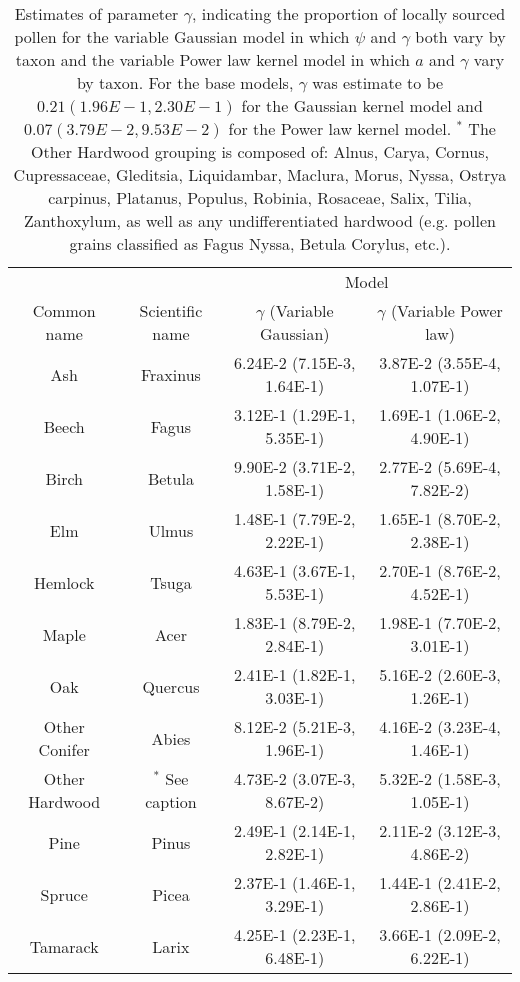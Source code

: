 \begin{table}
\begin{center}
\begin{tabular}{cccc} 
\toprule
               &                 & \multicolumn{2}{c}{Model} \\
Common name    & Scientific name & $\gamma$ (Variable Gaussian) & $\gamma$ (Variable Power law) \\  \midrule
           Ash & Fraxinus        & 6.24E-2 (7.15E-3, 1.64E-1)   & 3.87E-2 (3.55E-4, 1.07E-1)    \\
         Beech & Fagus           & 3.12E-1 (1.29E-1, 5.35E-1)   & 1.69E-1 (1.06E-2, 4.90E-1)    \\
         Birch & Betula          & 9.90E-2 (3.71E-2, 1.58E-1)   & 2.77E-2 (5.69E-4, 7.82E-2)    \\
           Elm & Ulmus           & 1.48E-1 (7.79E-2, 2.22E-1)   & 1.65E-1 (8.70E-2, 2.38E-1)    \\
       Hemlock & Tsuga           & 4.63E-1 (3.67E-1, 5.53E-1)   & 2.70E-1 (8.76E-2, 4.52E-1)    \\
         Maple & Acer            & 1.83E-1 (8.79E-2, 2.84E-1)   & 1.98E-1 (7.70E-2, 3.01E-1)    \\
           Oak & Quercus         & 2.41E-1 (1.82E-1, 3.03E-1)   & 5.16E-2 (2.60E-3, 1.26E-1)    \\
 Other Conifer & Abies           & 8.12E-2 (5.21E-3, 1.96E-1)   & 4.16E-2 (3.23E-4, 1.46E-1)    \\
Other Hardwood & $^{*}$ See caption    & 4.73E-2 (3.07E-3, 8.67E-2)   & 5.32E-2 (1.58E-3, 1.05E-1)    \\
          Pine & Pinus           & 2.49E-1 (2.14E-1, 2.82E-1)   & 2.11E-2 (3.12E-3, 4.86E-2)    \\
        Spruce & Picea           & 2.37E-1 (1.46E-1, 3.29E-1)   & 1.44E-1 (2.41E-2, 2.86E-1)    \\
      Tamarack & Larix           & 4.25E-1 (2.23E-1, 6.48E-1)   & 3.66E-1 (2.09E-2, 6.22E-1)    \\ \bottomrule
\end{tabular}
\caption{Estimates of parameter $\gamma$, indicating the proportion of locally sourced pollen for the variable Gaussian model in which $\psi$ and $\gamma$ both vary by taxon and the variable Power law kernel model in which $a$ and $\gamma$ vary by taxon. For the base models, $\gamma$ was estimate to be $0.21  (1.96E-1, 2.30E-1) $ for the Gaussian kernel model and $0.07  (3.79E-2, 9.53E-2) $ for the Power law kernel model. $^{*}$ The Other Hardwood grouping is composed of: Alnus, Carya, Cornus, Cupressaceae, Gleditsia, Liquidambar, Maclura, Morus, Nyssa, Ostrya carpinus, Platanus, Populus, Robinia, Rosaceae, Salix, Tilia, Zanthoxylum, as well as any undifferentiated hardwood (e.g. pollen grains classified as Fagus \@backslashchar Nyssa, Betula \@backslashchar Corylus, etc.).}
\end{center}
\label{table:gamma}
\vspace{2cm}
\end{table}


